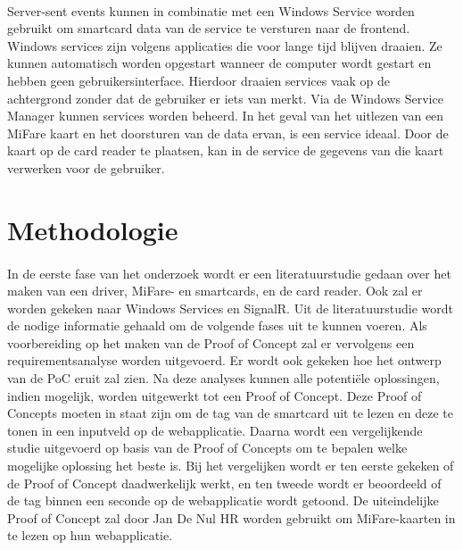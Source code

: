 \paragraph{}
Server-sent events kunnen in combinatie met een Windows Service worden gebruikt om smartcard data van de service te versturen naar de frontend.
Windows services zijn volgens \textcite{MicrosoftWS} applicaties die voor lange tijd blijven draaien. Ze kunnen automatisch worden opgestart wanneer de computer wordt gestart en hebben geen gebruikersinterface. Hierdoor draaien services vaak op de achtergrond zonder dat de gebruiker er iets van merkt. Via de Windows Service Manager kunnen services worden beheerd. In het geval van het uitlezen van een MiFare kaart en het doorsturen van de data ervan, is een service ideaal. Door de kaart op de card reader te plaatsen, kan in de service de gegevens van die kaart verwerken voor de gebruiker.

\bigskip
\section{Methodologie}%
\label{sec:methodologie}
\paragraph{}
In de eerste fase van het onderzoek wordt er een literatuurstudie gedaan over het maken van een driver, MiFare- en smartcards, en de card reader. Ook zal er worden gekeken naar Windows Services en SignalR. Uit de literatuurstudie wordt de nodige informatie gehaald om de volgende fases uit te kunnen voeren. Als voorbereiding op het maken van de Proof of Concept zal er vervolgens een requirementsanalyse worden uitgevoerd. Er wordt ook gekeken hoe het ontwerp van de PoC eruit zal zien. Na deze analyses kunnen alle potentiële oplossingen, indien mogelijk, worden uitgewerkt tot een Proof of Concept. Deze Proof of Concepts moeten in staat zijn om de tag van de smartcard uit te lezen en deze te tonen in een inputveld op de webapplicatie.
Daarna wordt een vergelijkende studie uitgevoerd op basis van de Proof of Concepts om te bepalen welke mogelijke oplossing het beste is. Bij het vergelijken wordt er ten eerste gekeken of de Proof of Concept daadwerkelijk werkt, en ten tweede wordt er beoordeeld of de tag binnen een seconde op de webapplicatie wordt getoond.
De uiteindelijke Proof of Concept zal door Jan De Nul HR worden gebruikt om MiFare-kaarten in te lezen op hun webapplicatie.

